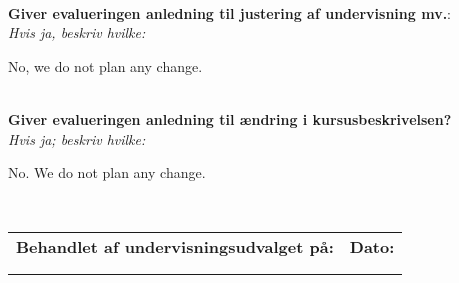 \documentclass[11pt]{article}
\begin{document}
  
~\\[1cm]\textcolor{sdublue}{{\bf Giver evalueringen anledning til justering af undervisning mv.}:\\
{\small \em Hvis ja, beskriv hvilke:}}

No, we do not plan any change.


~\\[1cm]\textcolor{sdublue}{{\bf Giver evalueringen anledning til ændring i kursusbeskrivelsen?}\\
{\small \em Hvis ja; beskriv hvilke:}}

No. We do not plan any change.

~\\[1cm]
\begin{tabu} to 1.0
  \hline
  Behandlet af undervisningsudvalget på: & Dato:\\ & \\ & \\ \hline
\end{tabu}
\end{document}
